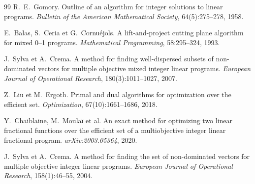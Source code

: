\documentclass[11pt,a4paper]{article}
\theoremstyle{plain}
\theoremstyle{remark}
\begin{document}
\begin{thebibliography}{99}
R.~E.~Gomory.
\newblock Outline of an algorithm for integer solutions to linear programs.
\newblock \emph{Bulletin of the American Mathematical Society},
  64(5):275--278, 1958.

E.~Balas, S.~Ceria et G.~Cornuéjols.
\newblock A lift-and-project cutting plane algorithm for mixed 0--1 programs.
\newblock \emph{Mathematical Programming}, 58:295--324, 1993.

J.~Sylva et A.~Crema.
\newblock A method for finding well-dispersed subsets of non-dominated vectors
  for multiple objective mixed integer linear programs.
\newblock \emph{European Journal of Operational Research},
  180(3):1011--1027, 2007.

Z.~Liu et M.~Ergoth.
\newblock Primal and dual algorithms for optimization over the efficient set.
\newblock \emph{Optimization}, 67(10):1661--1686, 2018.

Y.~Chaiblaine, M.~Moulaï et al.
\newblock An exact method for optimizing two linear fractional functions over
  the efficient set of a multiobjective integer linear fractional program.
\newblock \emph{arXiv:2003.05364}, 2020.

J.~Sylva et A.~Crema.
\newblock A method for finding the set of non-dominated vectors for multiple
  objective integer linear programs.
\newblock \emph{European Journal of Operational Research}, 158(1):46--55, 2004.
\end{thebibliography}
\end{document}
